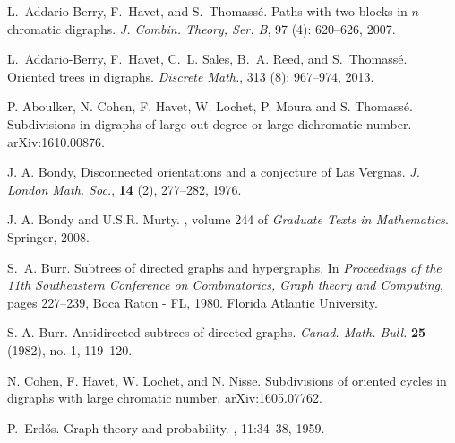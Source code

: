 \documentclass[utf8,10pt]{article}
\theoremstyle{plain}
\theoremstyle{definition}
\theoremstyle{remark}
\begin{document}
\begin{thebibliography}{XX}

L.~Addario-Berry, F.~Havet, and S.~Thomass{\'e}.
\newblock Paths with two blocks in $n$-chromatic digraphs.
\newblock \emph{J. Combin. Theory, Ser. B}, 97
  (4): 620--626, 2007.

L.~Addario-Berry, F.~Havet, C.~L. Sales, B.~A. Reed, and S.~Thomass{\'e}.
\newblock Oriented trees in digraphs.
\newblock \emph{Discrete Math.}, 313 (8): 967--974,
  2013.

P. Aboulker, N. Cohen, F. Havet, W. Lochet, P. Moura and S. Thomass\'e.
\newblock Subdivisions in digraphs of large out-degree or large dichromatic number.
\newblock arXiv:1610.00876.


    J. A. Bondy, Disconnected orientations and a conjecture of Las Vergnas.
{\it J. London Math. Soc.}, {\bf 14} (2), 277--282, 1976.


J. A. Bondy and U.S.R. Murty.
, volume 244 of {\em Graduate Texts in
  Mathematics}.
\newblock Springer, 2008.



S.~A. Burr.
\newblock Subtrees of directed graphs and hypergraphs.
\newblock In \emph{Proceedings of the 11th Southeastern Conference on
  Combinatorics, Graph theory and Computing}, pages 227--239, Boca Raton - FL,
  1980. Florida Atlantic University.

 S. A. Burr.
Antidirected subtrees of directed graphs.
{\it Canad. Math. Bull.} {\bf 25} (1982), no. 1, 119--120.

N. Cohen, F. Havet, W. Lochet, and N. Nisse.
\newblock Subdivisions of oriented cycles in digraphs with large chromatic number.
\newblock arXiv:1605.07762.

P.~Erd{\H{o}}s.
\newblock Graph theory and probability.
, 11:34--38, 1959.





\end{thebibliography}
\end{document}
